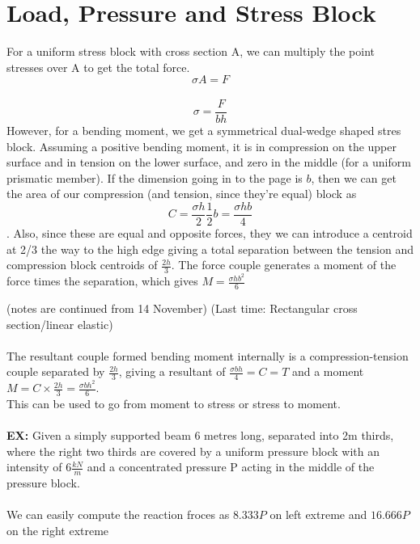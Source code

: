 \documentclass[10pt, twocolumn]{report}
\begin{document}
  \chapter{Load, Pressure and Stress Block}
  For a uniform stress block with cross section A, we can multiply the point stresses over A to get the total force.
  $$\sigma A = F$$ \\
  $$\sigma = \frac{F}{bh}$$
  However, for a bending moment, we get a symmetrical dual-wedge shaped stres block. Assuming a positive bending moment, it is in compression on the upper surface and in tension on the lower surface, and zero in the middle (for a uniform prismatic member). If the dimension going in to the page is $b$, then we can get the area of our compression (and tension, since they're equal) block as $$C = \frac{\sigma h}{2} \frac{1}{2}b = \frac{\sigma h b}{4}$$. Also, since these are equal and opposite forces, they we can introduce a centroid at 2/3 the way to the high edge giving a total separation between the tension and compression block centroids of $\frac{2h}{3}$. The force couple generates a moment of the force times the separation, which gives $M = \frac{\sigma hb^2}{6}$

  (notes are continued from 14 November)
  (Last time: Rectangular cross section/linear elastic) \\ \\

  The resultant couple formed bending moment internally is a compression-tension couple separated by $\frac{2h}{3}$, giving a resultant of
  $\frac{\sigma bh}{4} = C = T$ and a moment $M = C\times\frac{2h}{3} = \frac{\sigma bh^2}{6}$. \\ This can be used to go from moment to stress or stress to moment.\\\\

  \textbf{EX:} Given a simply supported beam 6 metres long, separated into 2m thirds, where the right two thirds are covered by a uniform pressure block with an intensity of $6 \frac{kN}{m}$ and a concentrated pressure P acting in the middle of the pressure block. \\\\ We can easily compute the reaction froces as $8.333P$ on left extreme and $16.666P$ on the right extreme \\\\
\end{document}
